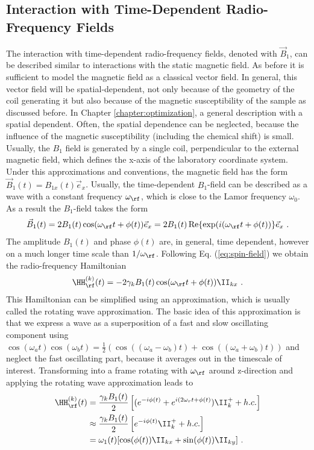 \subsection{Interaction with Time-Dependent Radio-Frequency Fields}
The interaction with time-dependent radio-frequency fields, denoted with $\vec B_1$, can be described similar to interactions with the static magnetic field.
As before it is sufficient to model the magnetic field as a classical vector field.
In general, this vector field will be spatial-dependent, not only because of the geometry of the coil generating it but also because of the magnetic susceptibility of the sample as discussed before. In Chapter \ref{chapter:optimization}, a general description with a spatial dependent. Often, the spatial dependence can be neglected, because the influence of the magnetic susceptibility (including the chemical shift)
is small. 
Usually, the $B_1$ field is generated by a single coil, perpendicular to the external magnetic field, which defines the x-axis of the laboratory coordinate system.
Under this approximations and conventions, the magnetic field has the form $\vec B_1(t) = B_{1x}(t)\vec e_x$.
Usually, the time-dependent $B_1$-field can be described as a wave with a constant frequency $\omega_{\rf}$, which is close to the Lamor frequency $\omega_0$. As a result the $B_1$-field takes the form
\begin{align}
  \vec B_1(t) = 2 B_1(t)\cos(\omega_\rf t + \phi(t)) \vec e_x=  2 B_1(t)\operatorname{Re}\{\exp(i (\omega_\rf t + \phi(t))\} \vec e_x~.
\end{align}
The amplitude $B_1(t)$ and phase $\phi(t)$ are, in general, time dependent, however on a
much longer time scale than $1/\omega_{\rf}$.
Following Eq. (\ref{eq:spin-field}) we obtain the radio-frequency Hamiltonian
\begin{align}
  \HH^{(k)}_{\rf}(t)=- 2 \gamma_k B_1(t)\cos(\omega_\rf t + \phi(t))\II_{kx}~.
\end{align}
This Hamiltonian can be simplified using an approximation, which is usually called the rotating wave approximation.
The basic idea of this approximation is that we express a wave as a superposition of a fast and slow oscillating component using $\cos (\omega_a t) \cos (\omega_b t) = \frac{1}{2}(\cos ((\omega_a -\omega_b)t) + \cos ((\omega_a +\omega_b)t))$ and neglect the fast oscillating part, because it averages out in the timescale of interest.
Transforming into a frame rotating with $\omega_{\rf}$ around z-direction and applying the rotating wave approximation leads to
\begin{align}
  \HH^{(k)}_{\rf}(t) &= \frac{\gamma_{k} B_1(t)}{2}\left[(e^{-i\phi(t)}+e^{i(2\omega_rt+\phi(t)})\II^{+}_{k} + h.c.\right]\\
 &\approx \frac{\gamma_{k} B_1(t)}{2}\left[e^{-i\phi(t)}\II^{+}_{k}+ h.c.\right]\\
 &= \omega_1(t)[\cos(\phi(t))\II_{kx}+\sin(\phi(t))\II_{ky}]~.
\end{align}
